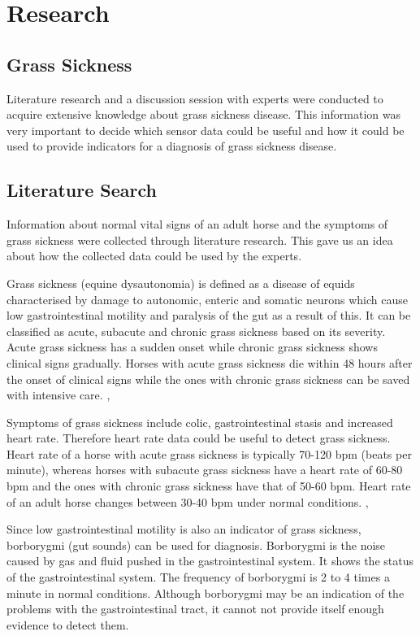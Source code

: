 \chapter{Research}
\label{chap:research}

\section{Grass Sickness}
Literature research and a discussion session with experts were conducted to acquire extensive knowledge about grass sickness disease. This information was very important to decide which sensor data could be useful and how it could be used to provide indicators for a diagnosis of grass sickness disease. 


\section{Literature Search}
Information about normal vital signs of an adult horse and the symptoms of grass sickness were collected through literature research. This gave us an idea about how the collected data could be used by the experts. 

Grass sickness (equine dysautonomia) is defined as a disease of equids characterised by damage to autonomic, enteric and somatic neurons which cause low gastrointestinal motility and paralysis of the gut as a result of this. It can be classified as acute, subacute and chronic grass sickness based on its severity. Acute grass sickness has a sudden onset while chronic grass sickness shows clinical signs gradually. Horses with acute grass sickness die within 48 hours after the onset of clinical signs while the ones with chronic grass sickness can be saved with intensive care. \cite{robinson2009current}, \cite{edwards2010edaphic} \cite{web}

Symptoms of grass sickness include colic, gastrointestinal stasis and increased heart rate. Therefore heart rate data could be useful to detect grass sickness. Heart rate of a horse with acute grass sickness is typically 70-120 bpm (beats per minute), whereas horses with subacute grass sickness have a heart rate of 60-80 bpm and the ones with chronic grass sickness have that of 50-60 bpm. Heart rate of an adult horse changes between 30-40 bpm under normal conditions. \cite{corley2009equine}, \cite{robinson2009current}

Since low gastrointestinal motility is also an indicator of grass sickness, borborygmi (gut sounds) can be used for diagnosis. Borborygmi is the noise caused by gas and fluid pushed in the gastrointestinal system. It shows the status of the gastrointestinal system. The frequency of borborygmi is 2 to 4 times a minute in normal conditions. Although borborygmi may be an indication of the problems with the gastrointestinal tract, it cannot not provide itself enough evidence to detect them. \cite{corley2009equine}


